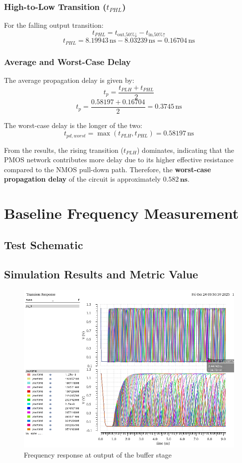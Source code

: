 \documentclass[12pt]{article}
\begin{document}
\subsubsection*{High-to-Low Transition (\(t_{PHL}\))}

For the falling output transition:
\[
t_{PHL} = t_{\text{out,50\%↓}} - t_{\text{in,50\%↑}}
\]
\[
t_{PHL} = 8.19943\,\text{ns} - 8.03239\,\text{ns} = 0.16704\,\text{ns}
\]

\subsubsection*{Average and Worst-Case Delay}

The average propagation delay is given by:
\[
t_p = \frac{t_{PLH} + t_{PHL}}{2}
\]
\[
t_p = \frac{0.58197 + 0.16704}{2} = 0.3745\,\text{ns}
\]

The worst-case delay is the longer of the two:
\[
t_{pd,worst} = \max(t_{PLH}, t_{PHL}) = 0.58197\,\text{ns}
\]

From the results, the rising transition (\(t_{PLH}\)) dominates, indicating that the PMOS network contributes more delay due to its higher effective resistance compared to the NMOS pull-down path. 
Therefore, the \textbf{worst-case propagation delay} of the circuit is approximately \(\mathbf{0.582\,ns}\).


\newpage

\section{Baseline Frequency Measurement}
\subsection{Test Schematic}



\newpage

\subsection{Simulation Results and Metric Value}

\begin{figure}[H]
    \centering
    \includegraphics[width=0.75\linewidth]{writeup//figures/frequency_response_param.png}
    \caption{Frequency response at output of the buffer stage}
\end{figure}
\end{document}
